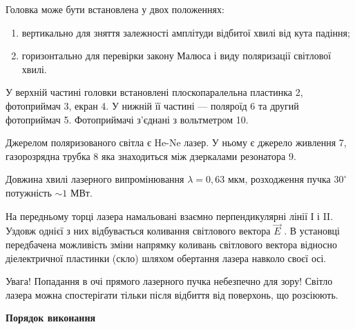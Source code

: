 \documentclass[12pt,a4paper]{article}
\begin{document}
    Головка може бути встановлена у двох положеннях:

    \begin{enumerate}[label=\alph*)]
        \item вертикально для зняття залежності амплітуди відбитої хвилі від кута падіння;
        \item горизонтально для перевірки закону Малюса і виду поляризації світлової хвилі.
    \end{enumerate}

    У верхній частині головки встановлені
    плоскопаралельна пластинка 2, фотоприймач 3,
    екран 4. У нижній її частині --- поляроїд 6 та
    другий фотоприймач 5. Фотоприймачі з'єднані з
    вольтметром 10.

    Джерелом поляризованого світла є He-Ne
    лазер. У ньому є джерело живлення 7, газорозрядна трубка 8 яка знаходиться між
    дзеркалами резонатора 9.

    Довжина хвилі лазерного випромінювання $\lambda = 0{,}63$ мкм,
    розходження пучка $30^{\circ}$ потужність $\sim 1$ МВт.

    На передньому торці лазера намальовані взаємно перпендикулярні лінії І і II.
    Уздовж однієї з них відбувається коливання світлового вектора $\vec{E}$ . В установці
    передбачена можливість зміни напрямку коливань світлового вектора відносно
    діелектричної пластинки (скло) шляхом обертання лазера навколо своєї осі.

    Увага! Попадання в очі прямого лазерного пучка небезпечно для зору! Світло лазера
    можна спостерігати тільки після відбиття від поверхонь, що розсіюють.

    \newpage

    \begin{center} \textbf{Порядок виконання} \end{center}
\end{document}
